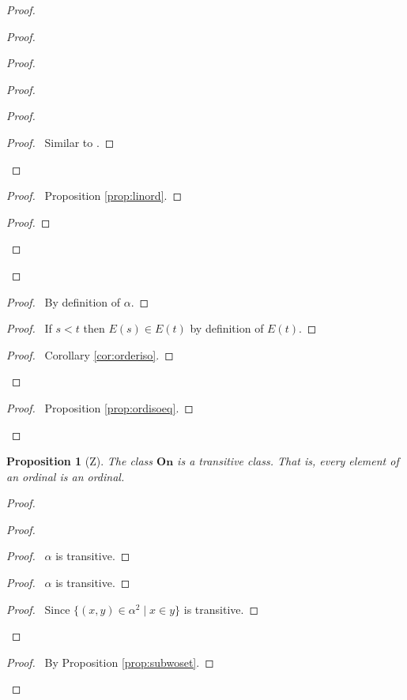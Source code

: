 \documentclass{book}
\let\qed\relax
\newtheorem{prop}[ax]{Proposition}
\theoremstyle{definition}
\begin{document}
\begin{proof}
\begin{proof}
\begin{proof}
\begin{proof}
\begin{proof}
\begin{proof}
					\pf\ Similar to .
				\end{proof}
			\end{proof}
			\begin{proof}
				\pf\ Proposition \ref{prop:linord}.
			\end{proof}
			\begin{proof}
			\end{proof}
		\end{proof}
	\end{proof}
	\begin{proof}
		\pf\ By definition of $\alpha$.
	\end{proof}
	\begin{proof}
		\pf\ If $s < t$ then $E(s) \in E(t)$ by definition of $E(t)$.
	\end{proof}
	\qedstep
	\begin{proof}
		\pf\ Corollary \ref{cor:orderiso}.
	\end{proof}
\end{proof}
\begin{proof}
	\pf\ Proposition \ref{prop:ordisoeq}.
\end{proof}
\qed
\end{proof}

\begin{prop}[Z]
\label{prop:elordinal}
The class $\mathbf{On}$ is a transitive class. That is, every element of an ordinal is an ordinal.
\end{prop}

\begin{proof}
\pf
{}
\begin{proof}
	\begin{proof}
		\pf\ $\alpha$ is transitive.
	\end{proof}
	\begin{proof}
		\pf\ $\alpha$ is transitive.
	\end{proof}
	\begin{proof}
		\pf\ Since $\{(x,y) \in \alpha^2 \mid x \in y\}$ is transitive.
	\end{proof}
\end{proof}
\begin{proof}
	\pf\ By Proposition \ref{prop:subwoset}.
\end{proof}
\qed
\end{proof}
\end{document}
